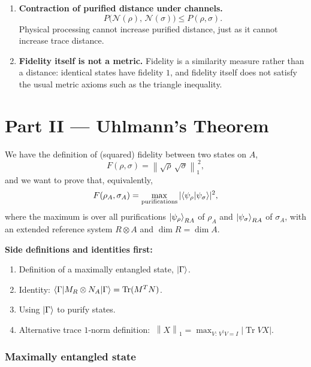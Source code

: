 \documentclass[11pt]{article}
\newcommand{\Tr}{\operatorname{Tr}}
\newcommand{\onenorm}[1]{\left\lVert #1 \right\rVert_{1}}
\begin{document}
\begin{enumerate}[label=\textbf{\arabic*.}, leftmargin=*, itemsep=6pt]
\item \textbf{Contraction of purified distance under channels.}
\[
P\!\big(\mathcal{N}(\rho),\,\mathcal{N}(\sigma)\big) \le P(\rho,\sigma).
\]
Physical processing cannot increase purified distance, just as it cannot
increase trace distance.

\item \textbf{Fidelity itself is not a metric.}
Fidelity is a similarity measure rather than a distance: identical states have
fidelity $1$, and fidelity itself does not satisfy the usual metric axioms such
as the triangle inequality.

\end{enumerate}

\clearpage

\part*{Part II --- Uhlmann's Theorem}

We have the definition of (squared) fidelity between two states on $A$,
\[
F(\rho,\sigma) = \onenorm{\sqrt{\rho}\,\sqrt{\sigma}}^{\,2},
\]
and we want to prove that, equivalently,
\[
F(\rho_A,\sigma_A) = \max_{\text{purifications}} |\!\braket{\psi_\rho|\psi_\sigma}\!|^{2},
\]
where the maximum is over all purifications $\ket{\psi_\rho}_{RA}$ of $\rho_A$
and $\ket{\psi_\sigma}_{RA}$ of $\sigma_A$, with an extended reference system
$R\otimes A$ and $\dim R = \dim A$.

\medskip
\noindent\textbf{Side definitions and identities first:}
\begin{enumerate}[label=\arabic*), nosep]
  \item Definition of a maximally entangled state, $\ket{\Gamma}$.
  \item Identity: $\braket{\Gamma|M_R\otimes N_A|\Gamma} = \Tr(M^{T}N)$.
  \item Using $\ket{\Gamma}$ to purify states.
  \item Alternative trace $1$-norm definition:
        $\ \onenorm{X} = \max_{V:\,V^{\dagger}V=I}|\Tr VX|$.
\end{enumerate}

\section{Maximally entangled state}
\end{document}
